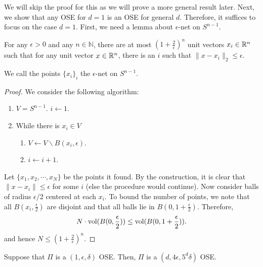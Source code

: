We will skip the proof for this as we will prove a more general result
later. Next, we show that any OSE for $d=1$ is an OSE for general
$d$. Therefore, it suffices to focus on the case $d=1$. First, we
need a lemma about $\epsilon$-net on $S^{n-1}$.
\begin{lem}
For any $\epsilon>0$ and any $n\in\mathbb{N}$, there are at most
$(1+\frac{2}{\epsilon})^{n}$ unit vectors $x_{i}\in\mathbb{R}^{n}$ such that
for any unit vector $x\in\mathbb{R}^{n}$, there is an $i$ such that $\|x-x_{i}\|_{2}\leq\epsilon$.
\end{lem}

\begin{rem*}
We call the points $\{x_{i}\}_{i}$ the $\epsilon$-net on $S^{n-1}$.
\end{rem*}
\begin{proof}
We consider the following algorithm:
\begin{enumerate}
\item $V=S^{n-1}$. $i\leftarrow1$.
\item While there is $x_{i}\in V$
\begin{enumerate}
\item $V\leftarrow V\backslash B(x_{i},\epsilon)$.
\item $i\leftarrow i+1$.
\end{enumerate}
\end{enumerate}
Let $\{x_{1},x_{2},\cdots,x_{N}\}$ be the points it found. By the
construction, it is clear that $\|x-x_{i}\|\leq\epsilon$ for some
$i$ (else the procedure would continue). Now consider balls of radius
$\epsilon/2$ centered at each $x_{i}$. To bound the number of points,
we note that all $B(x_{i},\frac{\epsilon}{2})$ are disjoint and that
all balls lie in $B(0,1+\frac{\epsilon}{2})$. Therefore,
\[
N\cdot\mathrm{vol}(B(0,\frac{\epsilon}{2}))\leq\mathrm{vol}(B(0,1+\frac{\epsilon}{2})).
\]
and hence $N\leq(1+\frac{2}{\epsilon})^{n}$.
\end{proof}
\begin{lem}
\label{lem:OSE_reduction}Suppose that $\Pi$ is a $(1,\epsilon,\delta)$
OSE. Then, $\Pi$ is a $(d,4\epsilon,5^{d}\delta)$ OSE.
\end{lem}

